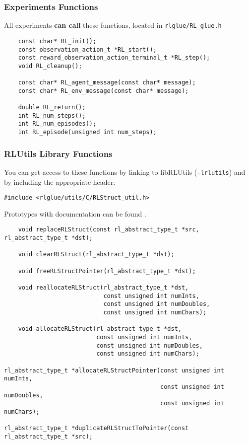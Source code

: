 \documentclass[11pt]{article}
\begin{document}
\subsubsection{Experiments Functions}
All experiments \textbf{can call} these functions, located in \texttt{rlglue/RL\_glue.h}
\begin{verbatim}
	const char* RL_init();
	const observation_action_t *RL_start();
	const reward_observation_action_terminal_t *RL_step();
	void RL_cleanup();

	const char* RL_agent_message(const char* message);
	const char* RL_env_message(const char* message);

	double RL_return();
	int RL_num_steps();
	int RL_num_episodes();
	int RL_episode(unsigned int num_steps);
\end{verbatim}

\subsubsection{RLUtils Library Functions}
\label{sec:util-functions}
You can get access to these functions by linking to libRLUtils (\texttt{-lrlutils}) and by including the appropriate header:

\begin{verbatim}
#include <rlglue/utils/C/RLStruct_util.h>
\end{verbatim}

Prototypes with documentation can be found .

\begin{verbatim}
	void replaceRLStruct(const rl_abstract_type_t *src, rl_abstract_type_t *dst);

	void clearRLStruct(rl_abstract_type_t *dst);

	void freeRLStructPointer(rl_abstract_type_t *dst);

	void reallocateRLStruct(rl_abstract_type_t *dst, 
                            const unsigned int numInts,
                            const unsigned int numDoubles,
                            const unsigned int numChars);

	void allocateRLStruct(rl_abstract_type_t *dst, 
                          const unsigned int numInts,
                          const unsigned int numDoubles, 
                          const unsigned int numChars);

rl_abstract_type_t *allocateRLStructPointer(const unsigned int numInts,
                                            const unsigned int numDoubles,
                                            const unsigned int numChars);

rl_abstract_type_t *duplicateRLStructToPointer(const rl_abstract_type_t *src);


\end{verbatim}
\end{document}

